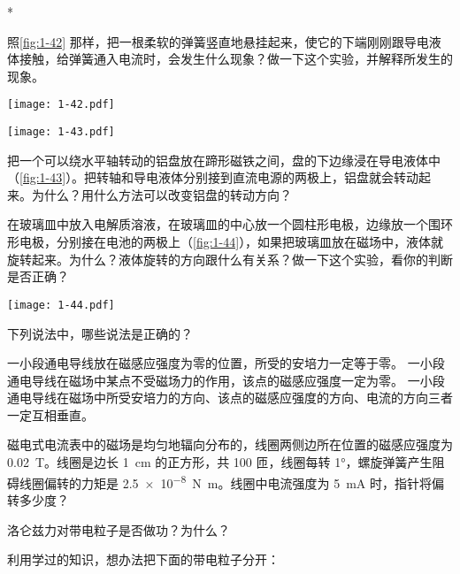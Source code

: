 \begin{Exercise}*
\begin{question}
  \item 照\cref{fig:1-42} 那样，把一根柔软的弹簧竖直地悬挂起来，使它的下端刚刚跟导电液体接触，给弹簧通入电流时，会发生什么现象？做一下这个实验，并解释所发生的现象。
  \begin{figurehere}
    \begin{minipage}[b]{0.48\linewidth}\centering
      \texttt{[image: 1-42.pdf]}
      \caption{}\label{fig:1-42}
    \end{minipage}
    \begin{minipage}[b]{0.48\linewidth}\centering
      \texttt{[image: 1-43.pdf]}
      \caption{}\label{fig:1-43}
    \end{minipage}
  \end{figurehere}
  \item 把一个可以绕水平轴转动的铝盘放在蹄形磁铁之间，盘的下边缘浸在导电液体中（\cref{fig:1-43}）。把转轴和导电液体分别接到直流电源的两极上，铝盘就会转动起来。为什么？用什么方法可以改变铝盘的转动方向？
  \item 在玻璃皿中放入电解质溶液，在玻璃皿的中心放一个圆柱形电极，边缘放一个围环形电极，分别接在电池的两极上（\cref{fig:1-44}），如果把玻璃皿放在磁场中，液体就旋转起来。为什么？液体旋转的方向跟什么有关系？做一下这个实验，看你的判断是否正确？
  \begin{figurehere}
    \begin{minipage}{\linewidth}\centering
      \texttt{[image: 1-44.pdf]}
      \caption{}\label{fig:1-44}
    \end{minipage}
  \end{figurehere}
  \item 下列说法中，哪些说法是正确的？
  \begin{tasks}
    \task 一小段通电导线放在磁感应强度为零的位置，所受的安培力一定等于零。
    \task 一小段通电导线在磁场中某点不受磁场力的作用，该点的磁感应强度一定为零。
    \task 一小段通电导线在磁场中所受安培力的方向、该点的磁感应强度的方向、电流的方向三者一定互相垂直。
  \end{tasks}
  \item 磁电式电流表中的磁场是均匀地辐向分布的，线圈两侧边所在位置的磁感应强度为 \qty{0.02}{T}。线圈是边长 \qty{1}{cm} 的正方形，共 100 匝，线圈每转 \ang{1}，螺旋弹簧产生阻碍线圈偏转的力矩是 \qty{2.5e-8}{N.m}。线圈中电流强度为 \qty{5}{mA} 时，指针将偏转多少度？
  \item 洛仑兹力对带电粒子是否做功？为什么？    
  \item 利用学过的知识，想办法把下面的带电粒子分开：

\end{question}
\end{Exercise}
